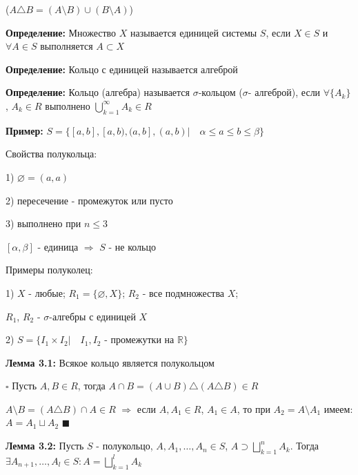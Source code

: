 \documentclass[a4paper]{report}
\begin{document}
($A\triangle B=(A\setminus B)\cup(B\setminus A)$)
\bigskip

\noindent\textbf{Определение:} Множество $X$ называется единицей системы $S$, если $X\in S$ и $\forall A\in S$ выполняется
$A\subset X$
\bigskip

\noindent\textbf{Определение:} Кольцо с единицей называется алгеброй
\bigskip

\noindent\textbf{Определение:} Кольцо (алгебра) называется $\sigma$-кольцом ($\sigma$- алгеброй), если $\forall\{A_k\}$, 
$A_k\in R$ выполнено $\bigcup\limits_{k=1}^\infty A_k\in R$
\bigskip

\noindent\textbf{Пример:} $S=\{[a,b],[a,b),(a,b],(a,b)|\quad\alpha\le a\le b\le\beta\}$
\bigskip

\noindent Свойства полукольца:

1) $\varnothing=(a,a)$

2) пересечение - промежуток или пусто

3) выполнено при $n\le3$

$[\alpha,\beta]$ - единица $\Rightarrow$ $S$ - не кольцо
\bigskip

\noindent Примеры полуколец:

1) $X$ - любые; $R_1=\{\varnothing,X\}$; $R_2$ - все подмножества $X$;

$R_1$, $R_2$ - $\sigma$-алгебры с единицей $X$

2) $S=\{I_1\times I_2|\quad I_1,I_2$ - промежутки на $\mathbb R\}$
\bigskip

\noindent\textbf{Лемма 3.1:} Всякое кольцо является полукольцом

\noindent $\square$ Пусть $A,B\in R$, тогда $A\cap B=(A\cup B)\triangle(A\triangle B)\in R$

$A\setminus B=(A\triangle B)\cap A\in R$ $\Rightarrow$ если $A,A_1\in R$, $A_1\in A$, то при $A_2=A\setminus A_1$ имеем: 
$A=A_1\sqcup A_2$ $\blacksquare$
\bigskip

\noindent\textbf{Лемма 3.2:} Пусть $S$ - полукольцо, $A,A_1,\ldots,A_n\in S$, $A\supset\bigsqcup\limits_{k=1}^n A_k$. 
Тогда $\exists A_{n+1},\ldots,A_l\in S\colon A=\bigsqcup\limits_{k=1}^l A_k$
\end{document}
